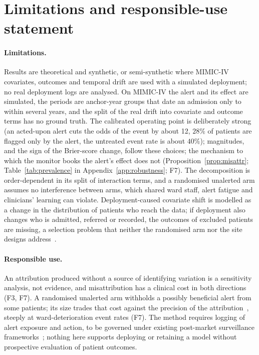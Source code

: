 \documentclass[letterpaper]{article} %
\begin{document}
\section{Limitations and responsible-use statement}
\label{sec:responsible}

\paragraph{Limitations.} Results are theoretical and synthetic, or
semi-synthetic where MIMIC-IV covariates, outcomes and temporal drift are used
with a simulated deployment; no real deployment logs are analysed. On MIMIC-IV
the alert and its effect are simulated, the periods are anchor-year groups
that date an admission only to within several years, and the split of the
real drift into covariate and outcome terms has no ground truth. The
calibrated operating point is deliberately strong (an acted-upon alert cuts
the odds of the event by about 12, $28\%$ of patients are flagged only by the
alert, the untreated event rate is about $40\%$); magnitudes, and the sign of the
Brier-score change, follow these choices; the mechanism to which the monitor
books the alert's effect does not
(Proposition~\ref{prop:misattr}; Table~\ref{tab:prevalence} in
Appendix~\ref{app:robustness}; F7). The
decomposition is order-dependent in its split of interaction terms, and a
randomised unalerted arm assumes no interference between arms, which shared ward staff,
alert fatigue and clinicians' learning can violate. Deployment-caused
covariate shift is modelled as a change in the distribution of patients who
reach the data; if deployment also changes who is admitted, referred or
recorded, the outcomes of excluded patients are missing, a selection problem
that neither the randomised arm nor the site designs
address~\citep{papadogeorgou2025selection}.

\paragraph{Responsible use.} An attribution produced
without a source of identifying variation is a sensitivity analysis, not
evidence, and misattribution has a clinical cost in both directions
(F3, F7). A randomised unalerted
arm withholds a possibly beneficial alert from some patients; its size trades
that cost against the precision of the
attribution~\citep{haidarwehbe2025holdout}, steeply at ward-deterioration
event rates (F7). The method requires logging of alert
exposure and action, to be governed under existing post-market surveillance
frameworks~\citep{gonzalez2024regulating}; nothing here supports deploying
or retaining a model without prospective evaluation of patient outcomes.
\end{document}
